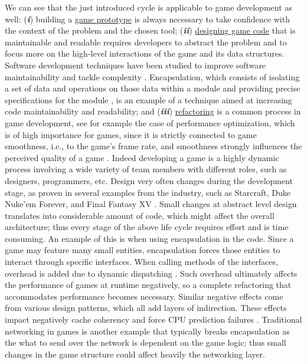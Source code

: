 We can see that the just introduced cycle is applicable to game development as well: (\textit{\textbf{i}}) building a \underline{game prototype} is always necessary to take confidence with the context of the problem and the chosen tool; (\textit{\textbf{ii}}) \underline{designing game code} that is maintainable and readable requires developers to abstract the problem and to focus more on the high-level interactions of the game and its data structures. Software development techniques have been studied to improve software maintainability and tackle complexity \cite{collar2006role}. Encapsulation, which consists of isolating a set of data and operations on those data within a module and providing precise specifications for the module \cite{citeulike:10949855}, is an example of a technique aimed at increasing code maintainability and readability; and (\textit{\textbf{iii}}) \underline{refactoring} is a common process in game development, see for example the case of performance optimization, which is of high importance for games, since it is strictly connected to game smoothness, i.e., to the game's frame rate, and smoothness strongly influences the perceived quality of a game \cite{claypool2009perspectives}. Indeed developing a game is a highly dynamic process \cite{takeuchi1986new} involving a wide variety of team members with different roles, such as designers, programmers, etc. Design very often changes during the development stage, as proven in several examples from the industry, such as Starcraft, Duke Nuke'em Forever, and Final Fantasy XV \cite{variety_article}. Small changes at abstract level design translates into considerable amount of code, which might affect the overall architecture; thus every stage of the above life cycle requires effort and is time consuming. An example of this is when using encapsulation \cite{zhou2008partial} in the code. Since a game may feature many small entities, encapsulation forces those entities to interact through specific interfaces. When calling methods of the interfaces, overhead is added due to dynamic dispatching \cite{zhou2008partial}. Such overhead ultimately affects the performance of games at runtime negatively, so a complete refactoring that accommodates performance becomes necessary. Similar negative effects come from various design patterns, which all add layers of indirection. These effects impact negatively cache coherency and force CPU prediction failures \cite{albrecht2009pitfalls}. Traditional networking in games is another example that typically breaks encapsulation as the what to send over the network is dependent on the game logic; thus small changes in the game structure could affect heavily the networking layer.


